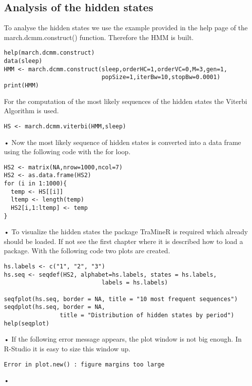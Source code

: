 \subsection{Analysis of the hidden states}
To analyse the hidden states we use the example provided in the help page of the march.dcmm.construct() function. Therefore the HMM is built. 
\begin{verbatim}
help(march.dcmm.construct)
data(sleep)
HMM <- march.dcmm.construct(sleep,orderHC=1,orderVC=0,M=3,gen=1,
                            popSize=1,iterBw=10,stopBw=0.0001)
print(HMM)
\end{verbatim}
For the computation of the most likely sequences of the hidden states the Viterbi Algorithm is used. 
\begin{verbatim}
HS <- march.dcmm.viterbi(HMM,sleep)
\end{verbatim}•
Now the most likely sequence of hidden states is converted into a data frame using the following code with the for loop. 
\begin{verbatim}
HS2 <- matrix(NA,nrow=1000,ncol=7)
HS2 <- as.data.frame(HS2)
for (i in 1:1000){
  temp <- HS[[i]]
  ltemp <- length(temp)
  HS2[i,1:ltemp] <- temp
}
\end{verbatim}•
To visualize the hidden states the package TraMineR is required which already should be loaded. If not see the first chapter where it is described how to load a package. With the following code two plots are created.
\begin{verbatim}
hs.labels <- c("1", "2", "3")
hs.seq <- seqdef(HS2, alphabet=hs.labels, states = hs.labels,
							labels = hs.labels)

seqfplot(hs.seq, border = NA, title = "10 most frequent sequences")
seqdplot(hs.seq, border = NA, 
                title = "Distribution of hidden states by period")
help(seqplot)
\end{verbatim}•
 If the following error message appears, the plot window is not big enough. In R-Studio it is easy to size this window up.  
\begin{verbatim}
Error in plot.new() : figure margins too large
\end{verbatim}•
